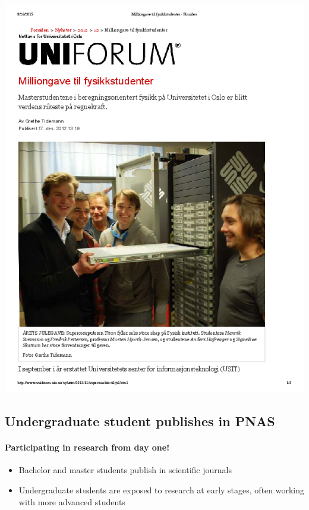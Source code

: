 \documentclass[%
twoside,                 %
final,                   %
10pt]{article}
\begin{document}



\centerline{\includegraphics[width=1.0\linewidth]{fig-future/uniforum-0.png}}




\subsection{Undergraduate student publishes in PNAS}

\paragraph{Participating in research from day one!}
\begin{itemize}
\item Bachelor and master students publish in scientific journals 

\item Undergraduate students are exposed to research at early stages, often working with more advanced students
\end{itemize}
\end{document}
